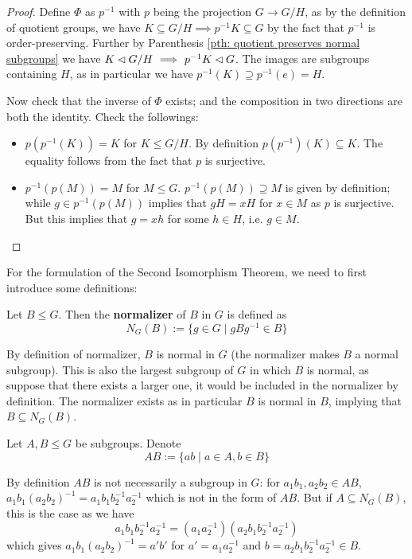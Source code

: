 \documentclass{article}
\begin{document}
\begin{proof}
    Define $\Phi$ as $p^{-1}$ with $p$ being the projection $G \to G/H$, as by the definition of quotient groups, we have $K \subseteq G/H \implies p^{-1}K \subseteq G$ by the fact that $p^{-1}$ is order-preserving. Further by Parenthesis \ref{pth: quotient preserves normal subgroups} we have $K \lhd G/H \ \Longrightarrow\  p^{-1}K \lhd G$. The images are subgroups containing $H$, as in particular we have $p^{-1}(K) \supseteq p^{-1}(e) = H$. 

    Now check that the inverse of $\Phi$ exists; and the composition in two directions are both the identity. Check the followings:
    \begin{itemize}
        \item $p(p^{-1}(K)) = K$ for $K \leq G/H$. By definition $p(p^{-1})(K) \subseteq K$. The equality follows from the fact that $p$ is surjective.
        \item $p^{-1}(p(M)) = M$ for $M \leq G$. $p^{-1}(p(M)) \supseteq M$ is given by definition; while $g \in p^{-1}(p(M))$ implies that $gH = xH$ for $x \in M$ as $p$ is surjective. But this implies that $g = xh$ for some $h \in H$, i.e. $g \in M$.
    \end{itemize}
\end{proof}

For the formulation of the Second Isomorphism Theorem, we need to first introduce some definitions:
\begin{definition}
    Let $B \leq G$. Then the \textbf{normalizer} of $B$ in $G$ is defined as
    \[
        N_G(B) := \{ g \in G \mid gBg^{-1} \in B \}
    \]
\end{definition}

\begin{remark}
    By definition of normalizer, $B$ is normal in $G$ (the normalizer makes $B$ a normal subgroup). This is also the largest subgroup of $G$ in which $B$ is normal, as suppose that there exists a larger one, it would be included in the normalizer by definition. The normalizer exists as in particular $B$ is normal in $B$, implying that $B \subseteq N_G(B)$.
\end{remark}

\begin{notation}
    Let $A, B \leq G$ be subgroups. Denote
    \[
        AB := \{ ab \mid a \in A, b \in B \}
    \]
\end{notation}

\begin{remark}
    By definition $AB$ is not necessarily a subgroup in $G$: for $a_1b_1, a_2 b_2 \in AB$, $a_1 b_1(a_2 b_2)^{-1} = a_1 b_1 b_2^{-1} a_2^{-1}$ which is not in the form of $AB$. But if $A \subseteq N_G(B)$, this is the case as we have
    \[
        a_1 b_1 b_2^{-1} a_2^{-1} = (a_1 a_2^{-1}) (a_2 b_1 b_2^{-1} a_2^{-1})
    \]
    which gives $a_1 b_1 (a_2 b_2)^{-1} = a' b'$ for $a' = a_1 a_2^{-1}$ and $b = a_2 b_1 b_2^{-1} a_2^{-1} \in B$.
\end{remark}
\end{document}
